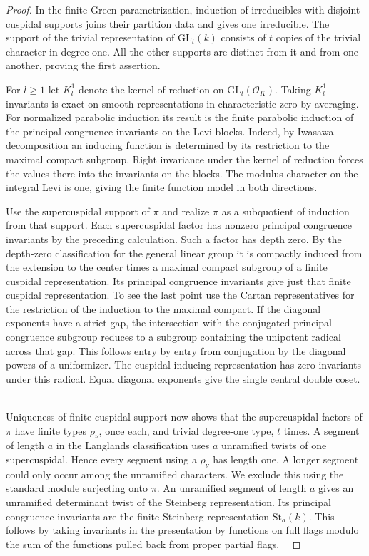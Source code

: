 \documentclass[a4paper,11pt]{article}
\theoremstyle{definition}
\theoremstyle{remark}
\numberwithin{equation}{section}
\begin{document}
\begin{proof}
In the finite Green parametrization, induction of irreducibles
with disjoint cuspidal supports joins their partition data and
gives one irreducible. The support of the trivial representation
of \(\mathrm{GL}_t(k)\) consists of \(t\) copies of the trivial
character in degree one. All the other supports are distinct from
it and from one another, proving the first assertion.
~\cite[\S2.3]{III-II-finitegreen801}

For \(l\ge1\) let \(K_l^1\) denote the kernel of reduction on
\(\mathrm{GL}_l(\mathcal O_K)\). Taking \(K_l^1\)-invariants is
exact on smooth representations in characteristic zero by averaging.
For normalized parabolic induction its result is the finite parabolic
induction of the principal congruence invariants on the Levi blocks.
Indeed, by Iwasawa decomposition an inducing function is determined
by its restriction to the maximal compact subgroup. Right invariance
under the kernel of reduction forces the values there into the
invariants on the blocks. The modulus character on the integral
Levi is one, giving the finite function model in both directions.

Use the supercuspidal support of \(\pi\) and realize \(\pi\) as
a subquotient of induction from that support. Each supercuspidal
factor has nonzero principal congruence invariants by the preceding
calculation. Such a factor has depth zero. By the depth-zero
classification for the general linear group it is compactly induced
from the extension to the center times a maximal compact subgroup
of a finite cuspidal representation. Its principal congruence
invariants give just that finite cuspidal representation. To see
the last point use the Cartan representatives for the restriction
of the induction to the maximal compact. If the diagonal exponents
have a strict gap, the intersection with the conjugated principal
congruence subgroup reduces to a subgroup containing the unipotent
radical across that gap. This follows entry by entry from conjugation
by the diagonal powers of a uniformizer. The cuspidal inducing
representation has zero invariants under this radical. Equal
diagonal exponents give the single central double coset.
~\cite[Prop.~6.8]{III-II-depthzero801}

Uniqueness of finite cuspidal support now shows that the supercuspidal
factors of \(\pi\) have finite types \(\rho_\nu\), once each, and
trivial degree-one type, \(t\) times. A segment of length \(a\) in
the Langlands classification uses \(a\) unramified twists of one
supercuspidal. Hence every segment using a \(\rho_\nu\) has length
one. A longer segment could only occur among the unramified
characters. We exclude this using the standard module surjecting
onto \(\pi\). An unramified segment of length \(a\) gives an
unramified determinant twist of the Steinberg representation.
Its principal congruence invariants are the finite Steinberg
representation \(\mathrm{St}_a(k)\). This follows by taking
invariants in the presentation by functions on full flags modulo
the sum of the functions pulled back from proper partial flags.
~\cite{III-II-segments801}


\end{proof}
\end{document}
